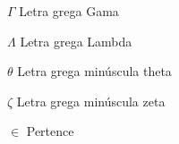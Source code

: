 \begin{simbolos}
  \item[$ \Gamma $] Letra grega Gama
  \item[$ \Lambda $] Letra grega Lambda
  \item[$ \theta $] Letra grega minúscula theta
  \item[$ \zeta $] Letra grega minúscula zeta
  \item[$ \in $] Pertence
\end{simbolos}


